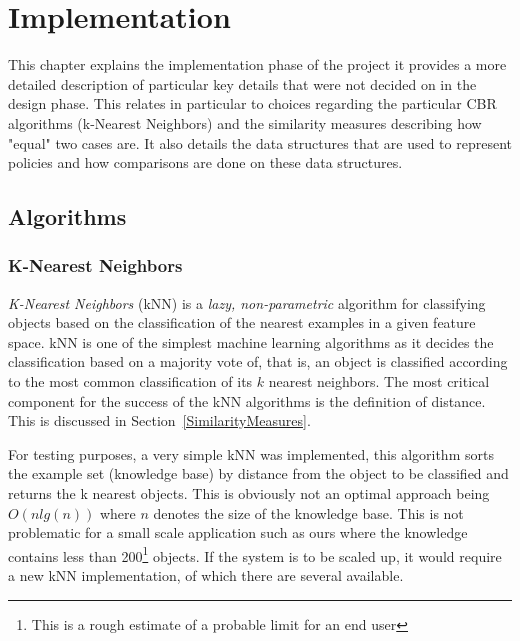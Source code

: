  
 

\chapter{Implementation}\label{impl}

\minitoc


This chapter explains the implementation phase of the project it provides a more detailed description of particular key
details that were not decided on in the design phase. This relates in particular to choices regarding the particular CBR algorithms
(k-Nearest Neighbors) and the similarity measures describing how "equal" two cases are. It also details the data structures that
are used to represent policies and how comparisons are done on these data structures.

\section{Algorithms}

\subsection{K-Nearest Neighbors}\label{kNN}

\emph{K-Nearest Neighbors} (kNN) is a \emph{lazy, non-parametric} algorithm for classifying objects based on the classification of the nearest examples in a given feature space. kNN is one of the simplest machine learning algorithms as it decides the classification based on a majority vote of, that is, an object is classified according to the most common classification of its $k$ nearest neighbors. The most critical component for the success of the kNN algorithms is the definition of distance. This is discussed in Section~\ref{SimilarityMeasures}. 

For testing purposes, a very simple kNN was implemented, this algorithm sorts the example set (knowledge base) by distance from the object to be classified and returns the k nearest objects. This is obviously not an optimal approach being $O(n lg(n))$ where $n$ denotes the size of the knowledge base. This is not problematic for a small scale application such as ours where the knowledge contains less than 200\footnote{This is a rough estimate of a probable limit for an end user} objects. If the system is to be scaled up, it would require a new kNN implementation, of which there are several available.

